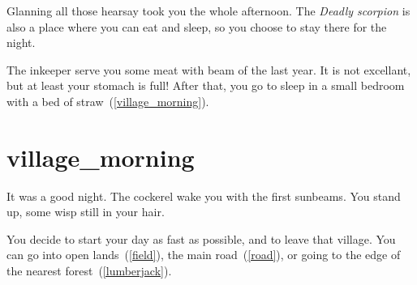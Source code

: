 Glanning all those hearsay took you the whole afternoon. The \textit{Deadly
scorpion} is also a place where you can eat and sleep, so you choose to stay
there for the night.

The inkeeper serve you some meat with beam of the last year. It is not
excellant, but at least your stomach is full! After that, you go to sleep in a
small bedroom with a bed of straw~(\ref{village_morning}).

\section{village_morning}

It was a good night. The cockerel wake you with the first sunbeams. You stand
up, some wisp still in your hair.

You decide to start your day as fast as possible, and to leave that village.
You can go into open lands~(\ref{field}), the main road~(\ref{road}), or
going to the edge of the nearest forest~(\ref{lumberjack}).

